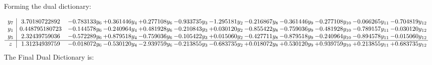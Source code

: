 \documentclass[11pt]{article}
\begin{document}
Forming the dual dictionary:

\[\begin{array}{c| c c@{\hskip 2pt} c@{\hskip 2pt} c@{\hskip 2pt} c@{\hskip 2pt} c@{\hskip 2pt} c@{\hskip 2pt} c@{\hskip 2pt} c@{\hskip 2pt} c@{\hskip 2pt} c@{\hskip 2pt} }
 y_{7}   &  3.70180722892 & -0.783133 y_{6} & + 0.361446 y_{4} & + 0.277108 y_{6} & -0.933735 y_{3} & -1.295181 y_{2} & -0.216867 y_{8} & -0.361446 y_{9} & -0.277108 y_{10} & -0.066265 y_{11} & -0.704819 y_{12}\\
 y_{1}   &  0.448795180723 & -0.144578 y_{6} & -0.240964 y_{4} & + 0.481928 y_{6} & -0.210843 y_{3} & + 0.030120 y_{2} & -0.855422 y_{8} & -0.759036 y_{9} & -0.481928 y_{10} & -0.789157 y_{11} & -0.030120 y_{12}\\
 y_{5}   &  2.32439759036 & -0.572289 y_{6} & + 0.879518 y_{4} & -0.759036 y_{6} & -0.105422 y_{3} & + 0.015060 y_{2} & -0.427711 y_{8} & -0.879518 y_{9} & -0.240964 y_{10} & -0.894578 y_{11} & -0.015060 y_{12}\\
\hline
z    &  1.31234939759 & -0.018072 y_{6} & -0.530120 y_{4} & -2.939759 y_{6} & -0.213855 y_{3} & -0.683735 y_{2} & + 0.018072 y_{8} & + 0.530120 y_{9} & + 0.939759 y_{10} & + 0.213855 y_{11} & + 0.683735 y_{12}\\
\end{array}\]
The Final Dual Dictionary is: 
\end{document}
